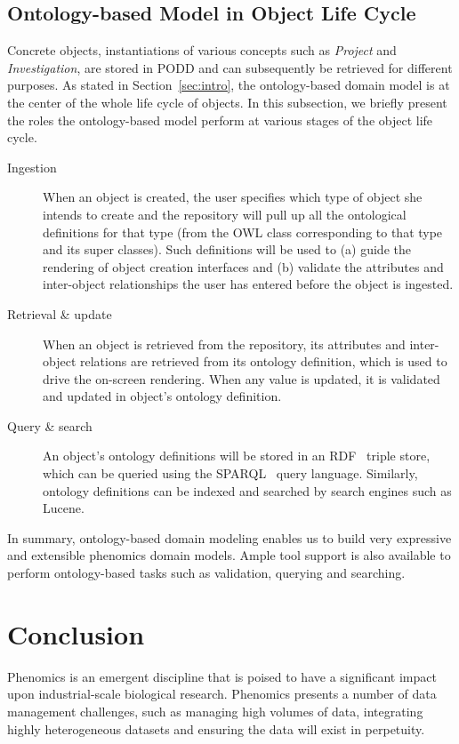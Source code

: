\documentclass{llncs}
\begin{document}
\vspace{-20pt}
\subsection{Ontology-based Model in Object Life Cycle}\label{sec:rav}
Concrete objects, instantiations of various concepts such as
\emph{Project} and \emph{Investigation}, are stored in PODD and can
subsequently be retrieved for different purposes. As stated in
Section~\ref{sec:intro}, the ontology-based domain model is at the
center of the whole life cycle of objects. In this subsection, we
briefly present the roles the ontology-based model perform at
various stages of the object life cycle.

\begin{description}
\item[Ingestion] When an object is created, the user specifies which
type of object she intends to create and the repository will pull up
all the ontological definitions for that type (from the OWL class
corresponding to that type and its super classes). Such definitions
will be used to (a) guide the rendering of object creation
interfaces and (b) validate the attributes and inter-object
relationships the user has entered before the object is ingested.

\item[Retrieval \& update] When an object is retrieved from the repository,
its attributes and inter-object relations are retrieved from its
ontology definition, which is used to drive the on-screen rendering.
When any value is updated, it is validated and updated in object's
ontology definition.

\item[Query \& search] An object's ontology definitions will be stored
in an RDF~\cite{rdfprimer04} triple store, which can be queried
using the SPARQL~\cite{sparql} query language. Similarly, ontology
definitions can be indexed and searched by search engines such as
Lucene.
\end{description}

In summary, ontology-based domain modeling enables us to build very
expressive and extensible phenomics domain models. Ample tool
support is also available to perform ontology-based tasks such as
validation, querying and searching.

\section{Conclusion}\label{sec:conclusion}
Phenomics is an emergent discipline that is poised to have a
significant impact upon industrial-scale biological research.
Phenomics presents a number of data management challenges, such as
managing high volumes of data, integrating highly heterogeneous
datasets and ensuring the data will exist in perpetuity.
\end{document}
